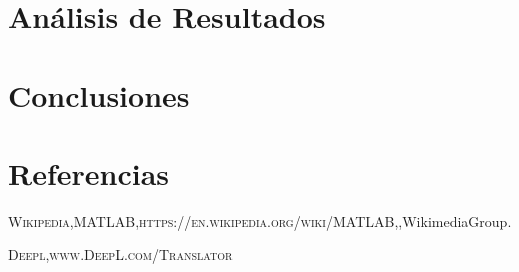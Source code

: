 \documentclass[]{article}
\begin{document}
\section{Análisis de Resultados}

\section{Conclusiones}

%
%
%
\section{Referencias}

\begin{thebibliography}{widestlabel}
	\textsc{Wikipedia},\textsc{MATLAB},\textsc{https://en.wikipedia.org/wiki/MATLAB},\textit{},WikimediaGroup.
	
   \textsc{Deepl},\textsc{www.DeepL.com/Translator}
	
	
	
\end{thebibliography}
\end{document}
